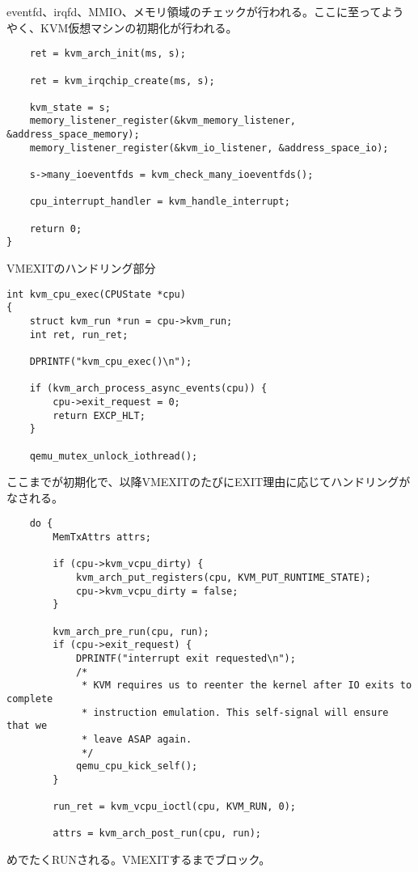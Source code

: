 \documentclass[9pt,b5paper,tombo]{jsbook}
\begin{document}
eventfd、irqfd、MMIO、メモリ領域のチェックが行われる。ここに至ってようやく、KVM仮想マシンの初期化が行われる。

\begin{lstlisting}
    ret = kvm_arch_init(ms, s);

    ret = kvm_irqchip_create(ms, s);

    kvm_state = s;
    memory_listener_register(&kvm_memory_listener, &address_space_memory);
    memory_listener_register(&kvm_io_listener, &address_space_io);

    s->many_ioeventfds = kvm_check_many_ioeventfds();

    cpu_interrupt_handler = kvm_handle_interrupt;

    return 0;
}
\end{lstlisting}

VMEXITのハンドリング部分

\begin{lstlisting}
int kvm_cpu_exec(CPUState *cpu)
{
    struct kvm_run *run = cpu->kvm_run;
    int ret, run_ret;

    DPRINTF("kvm_cpu_exec()\n");

    if (kvm_arch_process_async_events(cpu)) {
        cpu->exit_request = 0;
        return EXCP_HLT;
    }

    qemu_mutex_unlock_iothread();
\end{lstlisting}

ここまでが初期化で、以降VMEXITのたびにEXIT理由に応じてハンドリングがなされる。

\begin{lstlisting}
    do {
        MemTxAttrs attrs;

        if (cpu->kvm_vcpu_dirty) {
            kvm_arch_put_registers(cpu, KVM_PUT_RUNTIME_STATE);
            cpu->kvm_vcpu_dirty = false;
        }

        kvm_arch_pre_run(cpu, run);
        if (cpu->exit_request) {
            DPRINTF("interrupt exit requested\n");
            /*
             * KVM requires us to reenter the kernel after IO exits to complete
             * instruction emulation. This self-signal will ensure that we
             * leave ASAP again.
             */
            qemu_cpu_kick_self();
        }

        run_ret = kvm_vcpu_ioctl(cpu, KVM_RUN, 0);

        attrs = kvm_arch_post_run(cpu, run);
\end{lstlisting}

めでたくRUNされる。VMEXITするまでブロック。
\end{document}
